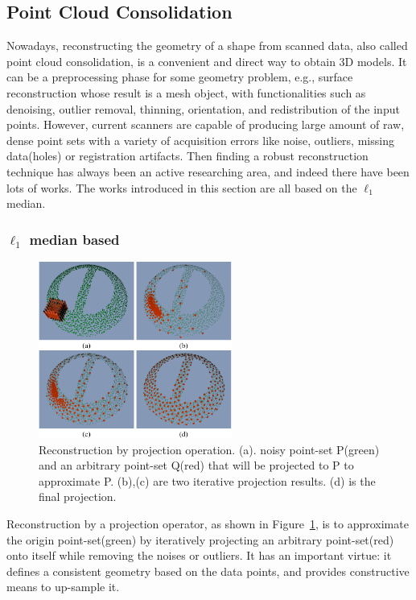 \subsection{Point Cloud Consolidation}
\label{subsec:Point Cloud Consolidation}


Nowadays, reconstructing the geometry of a shape from scanned data, also called point cloud consolidation, is a convenient and direct way to obtain 3D models.
It can be a preprocessing phase for some geometry problem, e.g., surface reconstruction whose result is a mesh object, with functionalities such as denoising, outlier removal, thinning, orientation, and redistribution of the input points.
However, current scanners are capable of producing large amount of raw, dense point sets with a variety of acquisition errors like noise, outliers, missing data(holes) or registration artifacts.
Then finding a robust reconstruction technique has always been an active researching area, and indeed there have been lots of works.
The works introduced in this section are all based on the $\ell_1$ median.

\subsubsection{$\ell_1$ median based}
\label{subsubsec:$L_1$ median based}

\begin{figure}[ht]
  \centering
  \includegraphics[width=2.5in]{images/L1median}
  \caption{Reconstruction by projection operation. (a). noisy point-set P(green) and an arbitrary point-set Q(red) that will be projected to P to approximate P. (b),(c) are two iterative projection results. (d) is the final projection.}
  \label{fig:L1 median}
\end{figure}

Reconstruction by a projection operator, as shown in Figure~\ref{fig:L1 median}, is to approximate the origin point-set(green) by iteratively projecting an arbitrary point-set(red) onto itself while removing the noises or outliers.
It has an important virtue: it defines a consistent geometry based on the data points, and provides constructive means to up-sample it.

